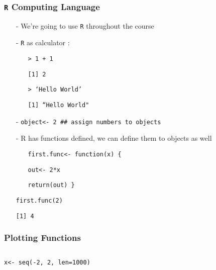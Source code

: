 \documentclass{beamer}
\numberwithin{equation}{section}
\begin{document}
\begin{frame}
\frametitle{{\tt R} Computing Language}
\begin{itemize}
\item[-] We're going to use {\tt R} throughout the course
\item[-] {\tt R} as calculator :
\begin{itemize}
\item[] {\tt > 1 + 1}
\item[] {\tt [1] 2 }
\item[] {\tt > `Hello World' }
\item[] {\tt [1] ``Hello World"}
\end{itemize}
\item[-] {\tt object<- 2 \#\# assign numbers to objects}
\item[-] R has functions defined, we can define them to objects as well
\begin{itemize}
\item[] {\tt first.func<- function(x) \{ }
\item[] {\tt 	out<- 2*x }
\item[] {\tt return(out) \} }
\end{itemize}
\item[] {\tt first.func(2)  }
\item[] {\tt [1] 4 }
\end{itemize}







\end{frame}


\begin{frame}
\frametitle{Plotting Functions}

\begin{columns}[]


{\tt x<- seq(-2, 2, len=1000)}\\




\end{columns}
\end{frame}
\end{document}
